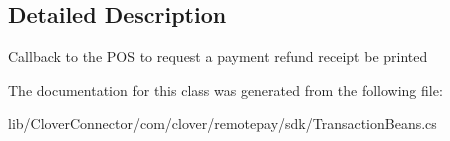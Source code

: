 \subsection{Detailed Description}
Callback to the P\+OS to request a payment refund receipt be printed 



The documentation for this class was generated from the following file\+:\begin{DoxyCompactItemize}
\item 
lib/\+Clover\+Connector/com/clover/remotepay/sdk/Transaction\+Beans.\+cs\end{DoxyCompactItemize}
